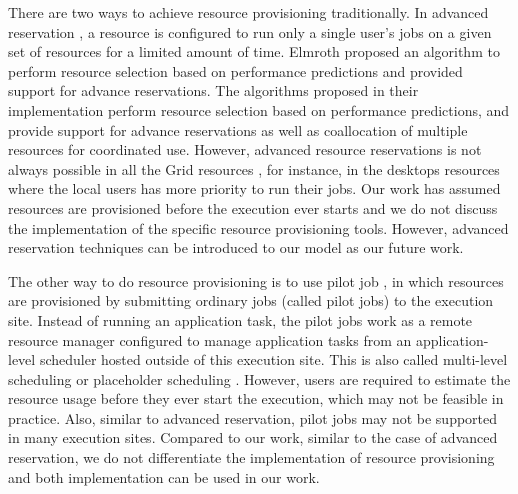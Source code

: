 There are two ways to achieve resource provisioning traditionally. In advanced reservation \cite{Castillo2008, Foster1999, Mcgough2005, Meinl2008}, a resource is configured to run only a single user's jobs on a given set of resources for a limited amount of time.  Elmroth \cite{Elmroth2009} proposed an algorithm to perform resource selection based on performance predictions and provided support for advance reservations. The algorithms proposed in their implementation perform resource selection based on performance predictions, and provide support for advance reservations as well as coallocation of multiple resources for coordinated use. However, advanced resource reservations is not always possible in all the Grid resources \cite{Singh2005a}, for instance, in the desktops resources where the local users has more priority to run their jobs. Our work has assumed resources are provisioned before the execution ever starts and we do not discuss the implementation of the specific resource provisioning tools. However, advanced reservation techniques can be introduced to our model as our future work. 

The other way to do resource provisioning is to use pilot job \cite{Sfiligoi2008, Juve2010a}, in which resources are provisioned by submitting ordinary jobs (called pilot jobs) to the execution site. Instead of running an application task, the pilot jobs work as a remote resource manager configured to manage application tasks from an application-level scheduler hosted outside of this execution site. This is also called multi-level scheduling \cite{Raicu2007} or placeholder scheduling \cite{Pinchak2002}. However, users are required to estimate the resource usage before they ever start the execution, which may not be feasible in practice. Also, similar to advanced reservation, pilot jobs may not be supported in many execution sites. Compared to our work, similar to the case of advanced reservation, we do not differentiate the implementation of resource provisioning and both implementation can be used in our work. 




